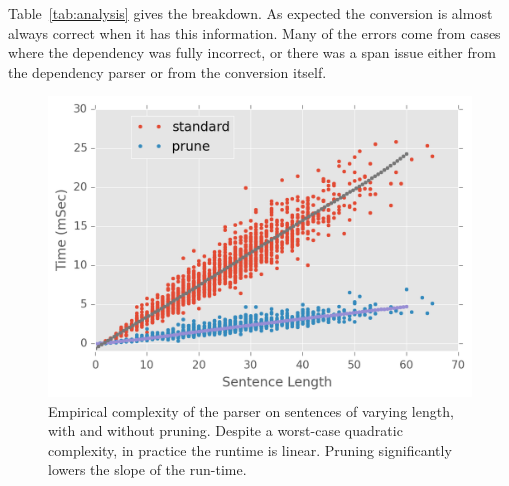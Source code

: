 \documentclass[11pt,letterpaper]{article}
\begin{document}
Table~\ref{tab:analysis} gives the breakdown. As expected the conversion 
is almost always correct when it has this information. Many of 
the errors come from cases where the dependency was fully 
incorrect, or there was a span issue either from the dependency 
parser or from the conversion itself.




\begin{figure}
  \centering
  \includegraphics[scale=0.5]{../notebooks/comp}
  \caption{Empirical complexity of the parser on sentences of varying length, with and without pruning. 
  Despite a worst-case quadratic complexity, in practice the runtime is linear. Pruning significantly lowers
  the slope of the run-time.}
\label{fig:speed}
\end{figure}
\end{document}
